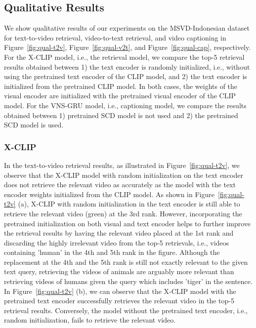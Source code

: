 \documentclass{article}
\begin{document}
\subsection{Qualitative Results}
We show qualitative results of our experiments on the MSVD-Indonesian dataset for text-to-video retrieval, video-to-text retrieval, and video captioning in Figure~\ref{fig:qual-t2v}, Figure~\ref{fig:qual-v2t}, and Figure~\ref{fig:qual-cap}, respectively. For the X-CLIP model, i.e., the retrieval model, we compare the top-5 retrieval results obtained between 1) the text encoder is randomly initialized, i.e., without using the pretrained text encoder of the CLIP model, and 2) the text encoder is initialized from the pretrained CLIP model. In both cases, the weights of the visual encoder are initialized with the pretrained visual encoder of the CLIP model. For the VNS-GRU model, i.e., captioning model, we compare the results obtained between 1) pretrained SCD model is not used and 2) the pretrained SCD model is used.

\subsubsection{X-CLIP}
In the text-to-video retrieval results, as illustrated in Figure~\ref{fig:qual-t2v}, we observe that the X-CLIP model with random initialization on the text encoder does not retrieve the relevant video as accurately as the model with the text encoder weights initialized from the CLIP model. As shown in Figure~\ref{fig:qual-t2v} (a), X-CLIP with random initialization in the text encoder is still able to retrieve the relevant video (green) at the 3rd rank. However, incorporating the pretrained initialization on both visual and text encoder helps to further improve the retrieval results by having the relevant video placed at the 1st rank and discarding the highly irrelevant video from the top-5 retrievals, i.e., videos containing 'human' in the 4th and 5th rank in the figure. Although the replacement at the 4th and the 5th rank is still not exactly relevant to the given text query, retrieving the videos of animals are arguably more relevant than retrieving videos of humans given the query which includes 'tiger' in the sentence. In Figure~\ref{fig:qual-t2v} (b), we can observe that the X-CLIP model with the pretrained text encoder successfully retrieves the relevant video in the top-5 retrieval results. Conversely, the model without the pretrained text encoder, i.e., random initialization, fails to retrieve the relevant video.
\end{document}
